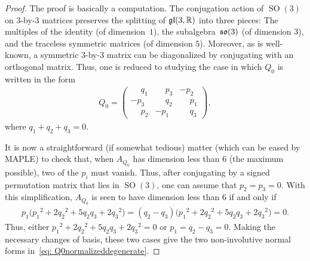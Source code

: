 \documentclass[pdftex]{sigma}
\numberwithin{equation}{section}
\newcommand{\bbR}{{\mathbb R}}
\newcommand{\SO}{\operatorname{SO}}
\newcommand{\euso}{\operatorname{\frak{so}}}
\newcommand{\eugl}{\operatorname{\frak{gl}}}
\newcommand{\phm}{\phantom{-}}
\begin{document}
\begin{proof}
The proof is basically a computation. The conjugation action of $\SO(3)$
on $3$-by-$3$ mat\-rices preserves the splitting of $\eugl(3,\bbR)$
into three pieces: The multiples of the identity (of dimension~$1$),
the subalgebra~$\euso(3)$ (of dimension $3$),
and the traceless symmetric matrices (of dimension $5$).
Moreover, as is well-known, a symmetric $3$-by-$3$ matrix can be
diagonalized by conjugating with an orthogonal matrix. Thus, one
is reduced to studying the case in which $Q_0$ is written in the form
\begin{gather}\label{eq: Q0normalized}
Q_0 = \begin{pmatrix}\phm q_1&\phm p_3&-p_2\\
 -p_3&\phm q_2&\phm p_1\\
 \phm p_2&-p_1&\phm q_3\end{pmatrix},
\end{gather}
where $q_1+q_2+q_3 = 0$.

It is now a straightforward (if somewhat tedious) matter
(which can be eased by MAPLE) to check that, when $A_{Q_0}$
has dimension less than $6$ (the maximum possible),
two of the $p_i$ must vanish. Thus, after conjugating by
a signed permutation matrix that lies in $\SO(3)$,
one can assume that $p_2=p_3=0$.
With this simplification, $A_{Q_0}$ is seen to have dimension
less than $6$ if and only if
\begin{gather*}
p_1 \big({p_1}^2 + 2{q_2}^2 + 5q_2q_3 + 2{q_3}^2\big) =
(q_2 - q_3) \big({p_1}^2 + 2{q_2}^2 + 5q_2q_3 + 2{q_3}^2\big) = 0.
\end{gather*}
Thus, either ${p_1}^2 + 2{q_2}^2 + 5q_2q_3 + 2{q_3}^2=0$ or $p_1=q_2-q_3=0$.
Making the necessary changes of basis,
these two cases give the two non-involutive normal forms
in~\eqref{eq: Q0normalizeddegenerate}.


\end{proof}
\end{document}
